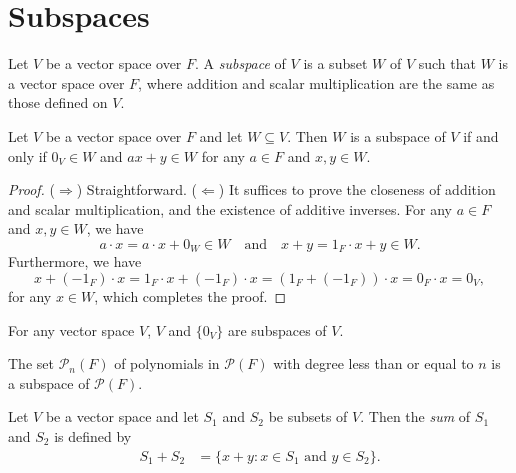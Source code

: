 \section{Subspaces}
\begin{definition}
  \label{def:subspace}
  Let $V$ be a vector space over $F$.
  A \emph{subspace} of $V$ is a subset $W$ of $V$ such that $W$ is a vector
  space over $F$, where addition and scalar multiplication are the same as
  those defined on $V$.
\end{definition}

\begin{theorem}
  \label{thm:subspace}
  Let $V$ be a vector space over $F$ and let $W \subseteq V$.
  Then $W$ is a subspace of $V$ if and only if $0_V \in W$ and $ax + y \in W$
  for any $a \in F$ and $x, y \in W$.
\end{theorem}
\begin{proof}
  ($\Rightarrow$)
  Straightforward.
  ($\Leftarrow$)
  It suffices to prove the closeness of addition and scalar multiplication,
  and the existence of additive inverses.
  For any $a \in F$ and $x, y \in W$, we have
  \begin{equation*}
    a \cdot x = a \cdot x + 0_W \in W
    \quad \text{and} \quad
    x + y = 1_F \cdot x + y \in W.
  \end{equation*}
  Furthermore, we have
  \begin{equation*}
    x + (-1_F) \cdot x
    = 1_F \cdot x + (-1_F) \cdot x
    = (1_F + (-1_F)) \cdot x
    = 0_F \cdot x
    = 0_V,
  \end{equation*}
  for any $x \in W$, which completes the proof.
\end{proof}

\begin{example}
  For any vector space $V$, $V$ and $\{0_V\}$ are subspaces of $V$.
\end{example}

\begin{example}
  The set $\mathcal{P}_n(F)$ of polynomials in $\mathcal{P}(F)$ with
  degree less than or equal to $n$ is a subspace of $\mathcal{P}(F)$.
\end{example}

\begin{definition}
  Let $V$ be a vector space and let $S_1$ and $S_2$ be subsets of $V$.
  Then the \emph{sum} of $S_1$ and $S_2$ is defined by
  \begin{align*}
    S_1 + S_2 &= \{x + y: \text{$x \in S_1$ and $y \in S_2$}\}.
  \end{align*}
\end{definition}

